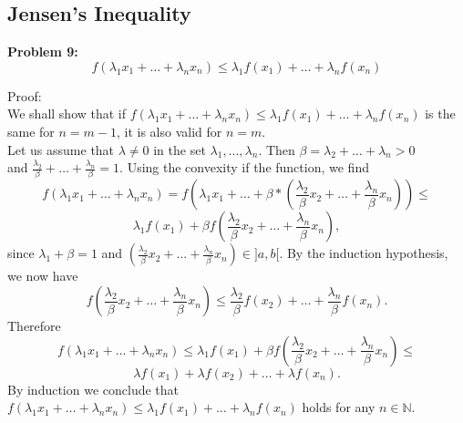 \documentclass{article}
\begin{document}
\subsection{Jensen's Inequality}
\textbf{Problem 9:}\\
\[ f(\lambda_1 x_1 + \dots + \lambda_n x_n) \le \lambda_1 f(x_1) + \dots + \lambda_n f(x_n) \]

Proof:\\
We shall show that if $ f(\lambda_1 x_1 + \dots + \lambda_n x_n) \le \lambda_1 f(x_1) + \dots + \lambda_n f(x_n) $ is the same for $n = m - 1$, it is also valid for $n = m$. \\ Let us assume that $\lambda \neq 0$ in the set $\lambda_1,...,\lambda_n$. Then $\beta = \lambda_2 + \dots +\lambda_n > 0$\\ and $\frac{\lambda_2}{\beta} + \dots + \frac{\lambda_n}{\beta} = 1$. Using the convexity if the function, we find
\[ f(\lambda_1 x_1 + \dots + \lambda_n x_n) = f(\lambda_1 x_1 + \dots + \beta*(\frac{\lambda_2}{\beta} x_2 + \dots + \frac{\lambda_n}{\beta} x_n)) \le \] \[ \lambda_1 f(x_1) + \beta f (\frac{\lambda_2}{\beta} x_2 + \dots + \frac{\lambda_n}{\beta} x_n), \] since $\lambda_1 + \beta = 1$ and $(\frac{\lambda_2}{\beta} x_2 + \dots + \frac{\lambda_n}{\beta} x_n) \in ]a,b[$.
By the induction hypothesis, we now have \[ f(\frac{\lambda_2}{\beta} x_2 + \dots + \frac{\lambda_n}{\beta} x_n) \le \frac{\lambda_2}{\beta} f(x_2) + \dots + \frac{\lambda_n}{\beta} f(x_n).\] Therefore \[f(\lambda_1 x_1 + \dots + \lambda_n x_n) \le \lambda_1 f(x_1) + \beta f(\frac{\lambda_2}{\beta} x_2 + \dots + \frac{\lambda_n}{\beta} x_n) \le \] \[\lambda f(x_1) + \lambda f(x_2) + \dots + \lambda f(x_n).\]
By induction we conclude that $ f(\lambda_1 x_1 + \dots + \lambda_n x_n) \le \lambda_1 f(x_1) + \dots + \lambda_n f(x_n) $  holds for any $n \in \mathbb{N}$.
\end{document}
